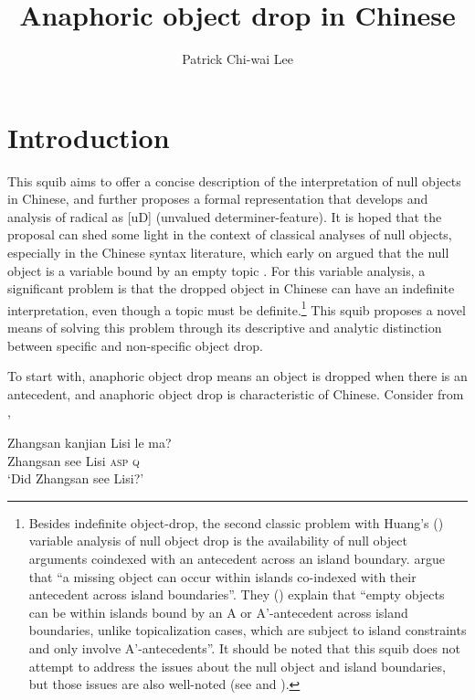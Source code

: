 \documentclass[output=paper]{LSP/langsci}
\author{Patrick Chi-wai Lee\affiliation{Caritas Institute of Higher Education, Hong Kong}}
\title{Anaphoric object drop in Chinese}
\begin{document}
 


\section{Introduction}

This squib aims to offer a concise description of the interpretation of null objects in Chinese, and further proposes a formal representation that develops  and  analysis of radical  as [uD] (unvalued determiner-feature). It is hoped that the proposal can shed some light in the context of classical analyses of null objects, especially in the Chinese syntax literature, which early on argued that the null object is a variable bound by an empty topic \citep{Huang1982,Huang1984,Huang1989}. For this variable analysis, a significant problem is that the dropped object in Chinese can have an indefinite interpretation, even though a topic must be definite.\footnote{Besides indefinite object-drop, the second classic problem with Huang’s (\citeyear{Huang1982,Huang1984,Huang1989}) variable analysis of null object drop is the availability of null object arguments coindexed with an antecedent across an island boundary.  \citet[277]{LiWei2014} argue that “a missing object can occur within islands co-indexed with their antecedent across island boundaries”. They (\citeyear[282]{LiWei2014}) explain that “empty objects can be within islands bound by an A or A’-antecedent across island boundaries, unlike topicalization cases, which are subject to island constraints and only involve A’-antecedents”. It should be noted that this squib does not attempt to address the issues about the null object and island boundaries, but those issues are also well-noted (see \citealt{LiWei2014} and \citealt{Li2014}).} This squib proposes a novel means of solving this problem through its descriptive and analytic distinction between specific and non-specific object drop.

To start with, anaphoric object drop means an object is dropped when there is an antecedent, and anaphoric object drop is characteristic of Chinese. Consider  from \citet[533]{Huang1984},

\ea%
    \label{ex:li:1}

\ea 
\gll  Zhangsan kanjian  Lisi le     ma?     \\
  Zhangsan see     Lisi \textsc{asp}   \textsc{q}  \\
\glt ‘Did Zhangsan see Lisi?’
\end{document}
